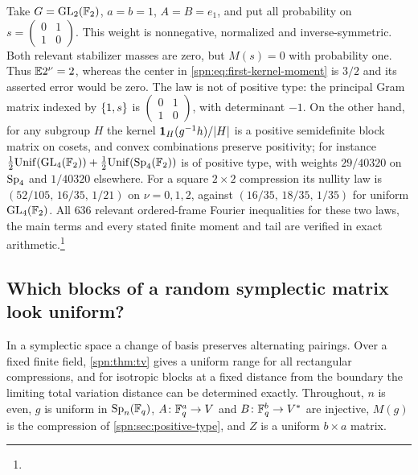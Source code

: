 \begin{example}\label{spn:ex:positive-type}
Take $G=\operatorname{GL}_2(\mathbb{F}_2)$, $a=b=1$, $A=B=e_1$, and put all probability on
$s=\left(\begin{smallmatrix}0&1\\1&0\end{smallmatrix}\right)$. This weight is
nonnegative, normalized and inverse-symmetric. Both relevant stabilizer
masses are zero, but $M(s)=0$ with probability one. Thus $\mathbb{E}2^\nu=2$,
whereas the center in \eqref{spn:eq:first-kernel-moment} is $3/2$ and its
asserted error would be zero. The law is not of positive type: the principal
Gram matrix indexed by $\{1,s\}$ is
$\left(\begin{smallmatrix}0&1\\1&0\end{smallmatrix}\right)$, with determinant
$-1$. On the other hand, for any subgroup $H$ the kernel
$\mathbf 1_H(g^{-1}h)/\lvert H\rvert$ is a positive semidefinite block matrix on
cosets, and convex combinations preserve positivity; for instance
$\tfrac12\mathrm{Unif}(\operatorname{GL}_4(\mathbb{F}_2))+\tfrac12\mathrm{Unif}(\operatorname{Sp}_4(\mathbb{F}_2))$ is
of positive type, with weights $29/40320$ on $\operatorname{Sp}_4$ and $1/40320$
elsewhere. For a square $2\times2$ compression its nullity law is
$(52/105,\,16/35,\,1/21)$ on $\nu=0,1,2$, against $(16/35,\,18/35,\,1/35)$
for uniform $\operatorname{GL}_4(\mathbb{F}_2)$. All $636$ relevant ordered-frame Fourier
inequalities for these two laws, the main terms and every stated finite
moment and tail are verified in exact
arithmetic.\footnote{}
\end{example}





\subsection{Which blocks of a random symplectic matrix look uniform?}\label{spn:sec:symplectic}

In a symplectic space a change of basis preserves alternating pairings. Over
a fixed finite field, \cref{spn:thm:tv} gives a uniform range for all
rectangular compressions, and for isotropic blocks at a fixed distance from
the boundary the limiting total variation distance can be determined
exactly. Throughout, $n$ is even, $g$ is uniform in $\operatorname{Sp}_n(\mathbb{F}_q)$,
$A\colon\mathbb{F}_q^a\to V$ and $B\colon\mathbb{F}_q^b\to V^*$ are injective, $M(g)$ is the
compression of \cref{spn:sec:positive-type}, and $Z$ is a uniform $b\times a$
matrix.

